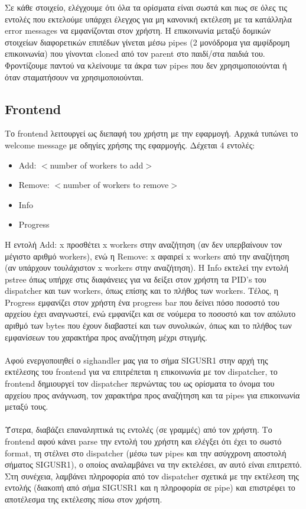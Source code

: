 \documentclass{article}
\begin{document}
	Σε κάθε στοιχείο, ελέγχουμε ότι όλα τα ορίσματα είναι σωστά και πως σε όλες τις εντολές που εκτελούμε υπάρχει έλεγχος για μη κανονική εκτέλεση με τα κατάλληλα error messages να εμφανίζονται στον χρήστη. Η επικοινωνία μεταξύ δομικών στοιχείων διαφορετικών επιπέδων γίνεται μέσω pipes (2 μονόδρομα για αμφίδρομη επικοινωνία) που γίνονται cloned από τον parent στο παιδί/στα παιδιά του. Φροντίζουμε παντού να κλείνουμε τα άκρα των pipes που δεν χρησιμοποιούνται ή όταν σταματήσουν να χρησιμοποιούνται.
	
	\subsection{Frontend}

	Το frontend λειτουργεί ως διεπαφή του χρήστη με την εφαρμογή. Αρχικά τυπώνει το welcome message με οδηγίες χρήσης της εφαρμογής. Δέχεται 4 εντολές:
	\begin{itemize}
		\item Add: $<$number of workers to add$>$
		\item Remove: $<$number of workers to remove$>$
		\item Info
		\item Progress
	\end{itemize}
	
	\noindent Η εντολή Add: x προσθέτει x workers στην αναζήτηση (αν δεν υπερβαίνουν τον μέγιστο αριθμό workers), ενώ η Remove: x αφαιρεί x workers από την αναζήτηση (αν υπάρχουν τουλάχιστον x workers στην αναζήτηση). Η Info εκτελεί την εντολή pstree όπως υπήρχε στις διαφάνειες για να δείξει στον χρήστη τα PID's του dispatcher και των workers, όπως επίσης και το πλήθος των workers. Τέλος, η Progress εμφανίζει στον χρήστη ένα progress bar που δείνει πόσο ποσοστό του αρχείου έχει αναγνωστεί, ενώ εμφανίζει και σε νούμερα το ποσοστό και τον απόλυτο αριθμό των bytes που έχουν διαβαστεί και των συνολικών, όπως και το πλήθος των εμφανίσεων του χαρακτήρα προς αναζήτηση μέχρι στιγμής.\\ 
	\\
	Αφού ενεργοποιηθεί ο sighandler μας για το σήμα SIGUSR1 στην αρχή της εκτέλεσης του frontend για να επιτρέπεται η επικοινωνία με τον dispatcher, το frontend δημιουργεί τον dispatcher περνώντας του ως ορίσματα το όνομα του αρχείου προς ανάγνωση, τον χαρακτήρα προς αναζήτηση και τα pipes για επικοινωνία μεταξύ τους.\\
	\\
	Ύστερα, διαβάζει επαναληπτικά τις εντολές (σε γραμμές) από τον χρήστη. Το frontend αφού κάνει parse την εντολή του χρήστη και ελέγξει ότι έχει το σωστό format, τη στέλνει στο dispatcher (μέσω των pipes και την ασύγχρονη αποστολή σήματος SIGUSR1), ο οποίος αναλαμβάνει να την εκτελέσει, αν αυτό είναι επιτρεπτό. Στη συνέχεια, λαμβάνει πληροφορία από τον dispatcher σχετικά με την εκτέλεση της εντολής (διακοπή από σήμα SIGUSR1 και η πληροφορία σε pipe) και επιστρέφει το αποτέλεσμα της εκτέλεσης πίσω στον χρήστη.
	
\end{document}

